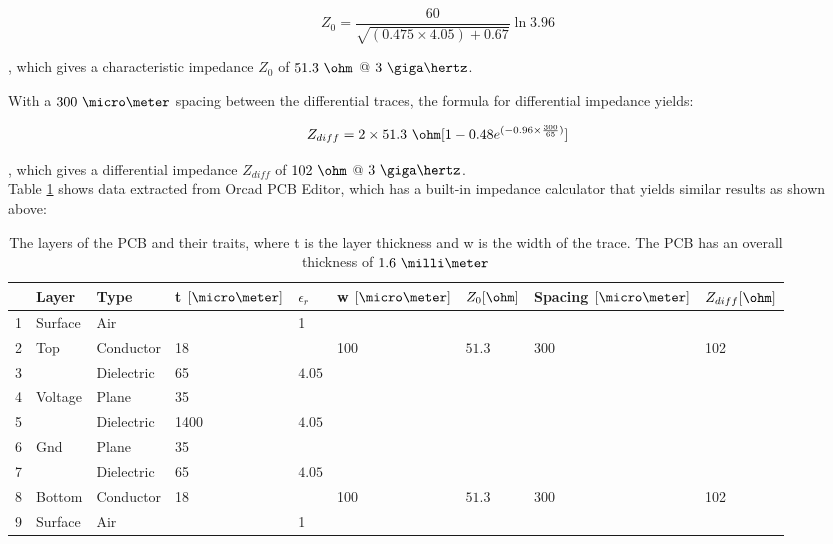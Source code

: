 \documentclass[main.tex]{subfiles}
\begin{document}
\begin{equation}
Z_0 = \frac{60}{\sqrt{(0.475 \times 4.05) + 0.67}}\ln{3.96}
\end{equation}

, which gives a characteristic impedance $Z_0$ of $51.3\ \ohm$ @ $3\ \giga\hertz$. 

With a $300\ \micro\meter$ spacing between the differential traces, the formula for differential impedance yields:

\begin{equation}
    Z_{diff} = 2 \times 51.3\ \ohm [1 - 0.48 e^{(-0.96 \times \frac{300}{65})}]
  \label{eq:zdiff}
\end{equation}

, which gives a differential impedance $Z_{diff}$ of $102\ \ohm$ @ $3\ \giga\hertz$.\\

Table \ref{tab:Xsect1} shows data extracted from Orcad PCB Editor, which has a built-in impedance calculator that yields similar results as shown above:

\begin{table} [H]
\begin{center}
    \begin{tabular}{| l | l | l | l | l | l | l | l | l |}
    \hline
     & Layer & Type & t $[\micro\meter]$ & $\epsilon_r$ & w $[\micro\meter]$  & $Z_0 [\ohm]$ & Spacing $[\micro\meter]$  & $Z_{diff} [\ohm]$ \\ 
     \hline
    1 	  & Surface & Air 		 & 		& 1 	 & 	   & 					& 	  & \\ \hline
    2 	  & Top 	& Conductor  & 18 	&        & 100 & $51.3$             & 300 & 102\\ \hline
    3 	  &  		& Dielectric & 65 	& $4.05$ & 	   & 					& 	  & \\ \hline
    4 	  & Voltage & Plane 	 & 35 	&        & 	   & 					& 	  & \\ \hline
    5 	  &  		& Dielectric & 1400 & $4.05$ & 	   &					&	  & \\ \hline
    6 	  & Gnd 	& Plane 	 & 35 	&        & 	   & 					& 	  & \\ \hline
    7 	  &  		& Dielectric & 65 	& $4.05$ &     & 					& 	  & \\ \hline
    8 	  & Bottom 	& Conductor  & 18 	&        & 100 & $51.3$             & 300 & 102\\ \hline
    9 	  & Surface & Air 		 & 	  	& 1 	 & 	   & 					& 	  & \\ \hline
    \end{tabular}
     \caption{The layers of the PCB and their traits, where t is the layer thickness and w is the width of the trace. The PCB has an overall thickness of $1.6\ \milli\meter$}
	\label{tab:Xsect1}
\end{center}
\end{table}
\end{document}
